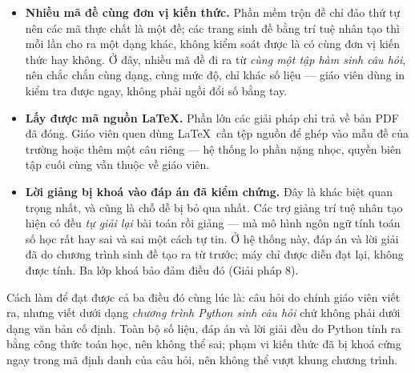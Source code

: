 \begin{itemize}[leftmargin=1.2cm, itemsep=3pt]
  \item \textbf{Nhiều mã đề cùng đơn vị kiến thức.} Phần mềm trộn đề chỉ đảo
        thứ tự nên các mã thực chất là một đề; các trang sinh đề bằng trí tuệ
        nhân tạo thì mỗi lần cho ra một dạng khác, không kiểm soát được là có
        cùng đơn vị kiến thức hay không. Ở đây, nhiều mã đề đi ra từ \textit{cùng
        một tập hàm sinh câu hỏi}, nên chắc chắn cùng dạng, cùng mức độ, chỉ
        khác số liệu --- giáo viên dùng in kiểm tra được ngay, không phải ngồi
        đổi số bằng tay.
  \item \textbf{Lấy được mã nguồn \LaTeX.} Phần lớn các giải pháp chỉ trả về
        bản PDF đã đóng. Giáo viên quen dùng \LaTeX\ cần tệp nguồn để ghép vào
        mẫu đề của trường hoặc thêm một câu riêng --- hệ thống lo phần nặng
        nhọc, quyền biên tập cuối cùng vẫn thuộc về giáo viên.
  \item \textbf{Lời giảng bị khoá vào đáp án đã kiểm chứng.} Đây là khác biệt
        quan trọng nhất, và cũng là chỗ dễ bị bỏ qua nhất. Các trợ giảng trí
        tuệ nhân tạo hiện có đều \textit{tự giải lại} bài toán rồi giảng --- mà
        mô hình ngôn ngữ tính toán số học rất hay sai và sai một cách tự tin.
        Ở hệ thống này, đáp án và lời giải đã do chương trình sinh đề tạo ra từ
        trước; máy chỉ được diễn đạt lại, không được tính. Ba lớp khoá bảo đảm
        điều đó (Giải pháp 8).
\end{itemize} Cách làm để đạt được cả ba điều đó cùng lúc là: câu hỏi do chính giáo
viên viết ra, nhưng viết dưới dạng \textit{chương trình Python sinh câu hỏi}
chứ không phải dưới dạng văn bản cố định. Toàn bộ số liệu, đáp án và lời giải
đều do Python tính ra bằng công thức toán học, nên không thể sai; phạm vi kiến
thức đã bị khoá cứng ngay trong mã định danh của câu hỏi, nên không thể vượt
khung chương trình.

\bigskip
